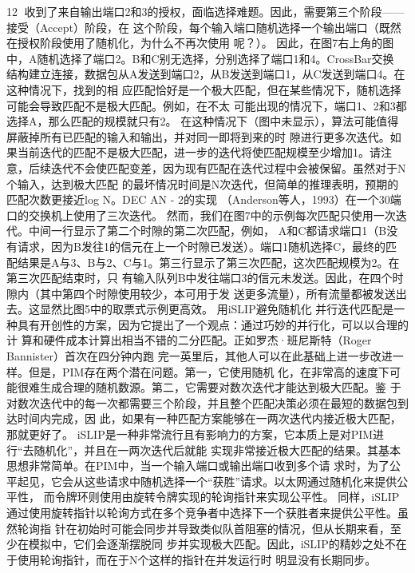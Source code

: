                                                    12
收到了来自输出端口2和3的授权，面临选择难题。因此，需要第三个阶段——接受（Accept）阶段，在
这个阶段，每个输入端口随机选择一个输出端口（既然在授权阶段使用了随机化，为什么不再次使用
呢？）。
因此，在图7右上角的图中，A随机选择了端口2。B和C别无选择，分别选择了端口1和4。CrossBar交换
结构建立连接，数据包从A发送到端口2，从B发送到端口1，从C发送到端口4。在这种情况下，找到的相
应匹配恰好是一个极大匹配，但在某些情况下，随机选择可能会导致匹配不是极大匹配。例如，在不太
可能出现的情况下，端口1、2和3都选择A，那么匹配的规模就只有2。
在这种情况下（图中未显示），算法可能值得屏蔽掉所有已匹配的输入和输出，并对同一即将到来的时
隙进行更多次迭代。如果当前迭代的匹配不是极大匹配，进一步的迭代将使匹配规模至少增加1。请注
意，后续迭代不会使匹配变差，因为现有匹配在迭代过程中会被保留。虽然对于N个输入，达到极大匹配
的最坏情况时间是N次迭代，但简单的推理表明，预期的匹配次数更接近log N。DEC AN - 2的实现
（Anderson等人，1993）在一个30端口的交换机上使用了三次迭代。
然而，我们在图7中的示例每次匹配只使用一次迭代。中间一行显示了第二个时隙的第二次匹配，例如，
A和C都请求端口1（B没有请求，因为B发往1的信元在上一个时隙已发送）。端口1随机选择C，最终的匹
配结果是A与3、B与2、C与1。第三行显示了第三次匹配，这次匹配规模为2。在第三次匹配结束时，只
有输入队列B中发往端口3的信元未发送。因此，在四个时隙内（其中第四个时隙使用较少，本可用于发
送更多流量），所有流量都被发送出去。这显然比图5中的取票式示例更高效。
用iSLIP避免随机化
并行迭代匹配是一种具有开创性的方案，因为它提出了一个观点：通过巧妙的并行化，可以以合理的计
算和硬件成本计算出相当不错的二分匹配。正如罗杰·班尼斯特（Roger Bannister）首次在四分钟内跑
完一英里后，其他人可以在此基础上进一步改进一样。但是，PIM存在两个潜在问题。第一，它使用随机
化，在非常高的速度下可能很难生成合理的随机数源。第二，它需要对数次迭代才能达到极大匹配。鉴
于对数次迭代中的每一次都需要三个阶段，并且整个匹配决策必须在最短的数据包到达时间内完成，因
此，如果有一种匹配方案能够在一两次迭代内接近极大匹配，那就更好了。
iSLIP是一种非常流行且有影响力的方案，它本质上是对PIM进行“去随机化”，并且在一两次迭代后就能
实现非常接近极大匹配的结果。其基本思想非常简单。在PIM中，当一个输入端口或输出端口收到多个请
求时，为了公平起见，它会从这些请求中随机选择一个“获胜”请求。以太网通过随机化来提供公平性，
而令牌环则使用由旋转令牌实现的轮询指针来实现公平性。
同样，iSLIP通过使用旋转指针以轮询方式在多个竞争者中选择下一个获胜者来提供公平性。虽然轮询指
针在初始时可能会同步并导致类似队首阻塞的情况，但从长期来看，至少在模拟中，它们会逐渐摆脱同
步并实现极大匹配。因此，iSLIP的精妙之处不在于使用轮询指针，而在于N个这样的指针在并发运行时
明显没有长期同步。


